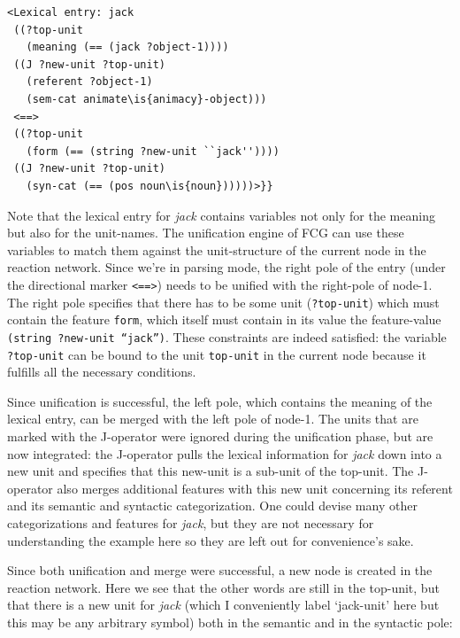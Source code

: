 \ea
\begin{lstlisting}
<Lexical entry: jack
 ((?top-unit
   (meaning (== (jack ?object-1))))
 ((J ?new-unit ?top-unit)
   (referent ?object-1)
   (sem-cat animate\is{animacy}-object)))
 <==>
 ((?top-unit
   (form (== (string ?new-unit ``jack''))))
 ((J ?new-unit ?top-unit)
   (syn-cat (== (pos noun\is{noun})))))>}}
\end{lstlisting}
\z


Note that the lexical entry for {\em jack} contains variables not only for the meaning but also for the unit-names. The unification engine of FCG can use these variables to match them against the unit-structure of the current node in the reaction network. Since we're in parsing mode, the right pole of the entry (under the directional marker {\tt <==>}) needs to be unified with the right-pole of node-1. The right pole specifies that there has to be some unit ({\tt ?top-unit}) which must contain the feature {\tt form}, which itself must contain in its value the feature-value {\tt (string ?new-unit ``jack'')}. These constraints are indeed satisfied: the variable {\tt ?top-unit} can be bound to the unit {\tt top-unit} in the current node because it fulfills all the necessary conditions.

Since unification is successful, the left pole, which contains the meaning of the lexical entry, can be merged with the left pole of node-1. The units that are marked with the J-operator were ignored during the unification phase, but are now integrated: the J-operator pulls the lexical information for {\em jack} down into a new unit and specifies that this new-unit is a sub-unit of the top-unit. The J-operator also merges additional features with this new unit concerning its referent and its semantic and syntactic categorization. One could devise many other categorizations and features for {\em jack}, but they are not necessary for understanding the example here so they are left out for convenience's sake.

Since both unification and merge were successful, a new node is created in the reaction network. Here we see that the other words are still in the top-unit, but that there is a new unit for {\em jack} (which I conveniently label `jack-unit' here but this may be any arbitrary symbol) both in the semantic and in the syntactic pole:

